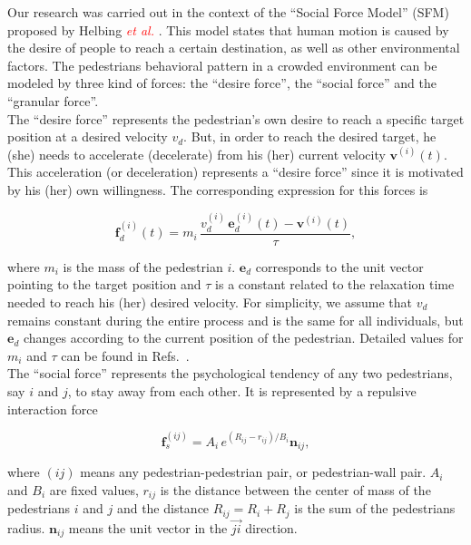 \documentclass[preprint,12pt]{elsarticle}
\begin{document}
Our research was carried out in the context of the ``Social Force Model'' (SFM) 
proposed by Helbing \textcolor{red} {\textit{et al.}} \cite{Helbing1}. This 
model states that human motion is caused by the desire of people to reach a 
certain destination, as well as other environmental factors. The pedestrians 
behavioral pattern in a crowded environment can be modeled by three kind of 
forces: the ``desire force'', the ``social force'' and the ``granular force''.\\

The ``desire force'' represents the pedestrian's own desire to reach a 
specific target position at a desired velocity $v_d$. But, in order to reach 
the desired target, he (she) needs to accelerate (decelerate) from his (her) 
current velocity $\mathbf{v}^{(i)}(t)$. This acceleration (or deceleration) 
represents a ``desire force'' since it is motivated by his (her) own 
willingness. The corresponding expression for this forces is 

\begin{equation}
        \mathbf{f}_d^ {(i)}(t) =  
m_i\,\displaystyle\frac{v_d^{(i)}\,\mathbf{e}_d^
{(i)}(t)-\mathbf{v}^{(i)}(t)}{\tau}, \label{desired}
\end{equation}

where $m_i$ is the mass of the pedestrian $i$. $\mathbf{e}_d$ 
corresponds to the unit vector pointing to the target position and $\tau$ is a 
constant related to the relaxation time needed to reach his (her) desired 
velocity. For simplicity, we assume that $v_d$ remains constant during the 
entire process and is the same for all individuals, but $\mathbf{e}_d$ changes 
according to the current position of the pedestrian. Detailed values for $m_i$ 
and $\tau$ can be found in Refs.~\cite{Helbing1,Dorso3}. \\

The ``social force'' represents the psychological tendency of any two pedestrians,  
say $i$ and $j$, to stay away from each other. It is represented by a repulsive interaction force 

\begin{equation}
        \mathbf{f}_s^{(ij)} = A_i\,e^{(R_{ij}-r_{ij})/B_i}\mathbf{n}_{ij}, 
        \label{social}
\end{equation}

where $(ij)$ means any pedestrian-pedestrian pair, or pedestrian-wall 
pair. $A_i$ and $B_i$ are fixed values, $r_{ij}$ is the distance between  the 
center of mass of the pedestrians $i$ and $j$ and the distance $R_{ij}=R_i+R_j$ 
is the sum of the pedestrians radius. $\mathbf{n}_{ij}$ means the unit vector in 
the $\vec{ji}$ direction.\\
\end{document}
